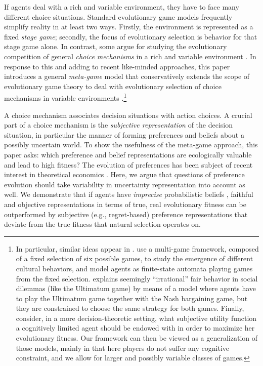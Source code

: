 \documentclass[fleqn,reqno,12pt]{article}
\theoremstyle{Satz}
\theoremstyle{Bsp}
\begin{document}
If agents deal with a rich and variable environment, they have to face many different choice
situations.  Standard evolutionary game models frequently simplify reality in at least two
ways. Firstly, the environment is represented as a fixed \emph{stage game}; secondly, the focus
of evolutionary selection is behavior for that stage game alone. In contrast, some argue for
studying the evolutionary competition of general \emph{choice mechanisms} in a rich and
variable environment
\citep[e.g.,][]{FawcettHamblin2013:Exposing-the-be,McNamara2013:Towards-a-Riche,HammStev12}. In
response to this and adding to recent like-minded approaches, this paper introduces a general
\emph{meta-game} model that conservatively extends the scope of evolutionary game theory to deal with
evolutionary selection of choice mechanisms in variable environments \citep[see also][]{Harley1981:Learning-the-Ev,ZollmanSmead2010:Plasticity-and-,SmeadZollman2013:The-Stability-o,OConnor2016:Evolving-to-Gen,RayoBecker07,Zollman2008,SkyrmsZollman10,BednarPage07}.\footnote{In particular, similar ideas appear in \citep{RayoBecker07,Zollman2008,BednarPage07}. \citep{BednarPage07} use a multi-game framework, composed of a fixed selection of six possible games, to study the emergence of different cultural behaviors, and model agents as finite-state automata playing games from the fixed selection. \citep{Zollman2008} explains seemingly ``irrational'' fair behavior in social dilemmas (like the Ultimatum game) by means of a model where agents have to play the Ultimatum game together with the Nash bargaining game, but they are constrained to choose the same strategy for both games. Finally, \citep{RayoBecker07} consider, in a more decision-theoretic setting, what subjective utility function a cognitively limited agent should be endowed with in order to maximize her evolutionary fitness. Our framework can then be viewed as a generalization of those models, mainly in that here players do not suffer any cognitive constraint, and we allow for larger and possibly variable classes of games.}

A choice mechanism associates decision situations with action choices. A crucial part of a
choice mechanism is the \emph{subjective representation} of the decision situation, in
particular the manner of forming preferences and beliefs about a possibly uncertain world. To
show the usefulness of the meta-game approach, this paper asks: which preference and belief
representations are ecologically valuable and lead to high fitness? The evolution of
preferences has been subject of recent interest in theoretical economics
\citep[e.g.,][]{algweib13,DekElyYlan07,RobSam11}. Here, we argue that questions of preference
evolution should take variability in uncertainty representation into account as well. We
demonstrate that if agents have \emph{imprecise} probabilistic beliefs
\citep[e.g.,][]{gardsah82,levi74,walley96}, faithful and objective representations in terms of
true, real evolutionary fitness can be outperformed by subjective (e.g., regret-based)
preference representations that deviate from the true fitness that natural selection operates
on.
\end{document}
